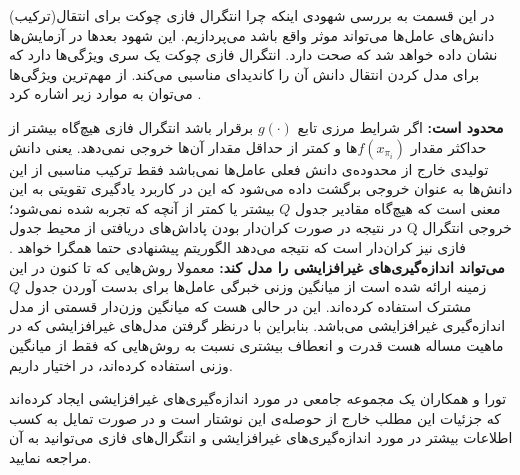 \label{sec:why_fci_works}
در این قسمت به بررسی شهودی اینکه چرا انتگرال فازی چوکت برای انتقال(ترکیب) دانش‌های عامل‌ها می‌تواند موثر واقع باشد می‌پردازیم. این شهود بعدها در آزمایش‌ها نشان داده خواهد شد که صحت دارد. انتگرال فازی چوکت یک سری ویژگی‌ها دارد که برای مدل کردن انتقال دانش آن را کاندیدای مناسبی می‌کند. از مهم‌ترین ویژگی‌ها می‌توان به موارد زیر اشاره کرد .
\begin{enumerate}
 \textbf{محدود است:} اگر شرایط مرزی تابع $g(\cdot)$ برقرار باشد انتگرال‌ فازی هیچ‌گاه بیشتر از حداکثر مقدار $f(x_{\pi_i})$ها و کمتر از حداقل مقدار آن‌ها خروجی نمی‌دهد. یعنی دانش تولیدی خارج از محدوده‌ی دانش فعلی عامل‌ها نمی‌باشد فقط ترکیب مناسبی از این دانش‌ها به عنوان خروجی برگشت داده می‌شود که این در کاربرد یادگیری تقویتی به این معنی است که هیچ‌گاه مقادیر جدول $Q$ بیشتر یا کمتر از آنچه که تجربه شده نمی‌شود؛ در نتیجه در صورت کران‌دار بودن پاداش‌های دریافتی از محیط جدول Q خروجی انتگرال فازی نیز کران‌دار است که نتیجه می‌دهد الگوریتم پیشنهادی حتما همگرا خواهد .
 \textbf{می‌تواند اندازه‌گیری‌های غیرافزایشی را مدل کند:} معمولا روش‌هایی که تا ‌کنون در این زمینه ارائه شده است از میانگین وزنی خبرگی عامل‌ها برای بدست آوردن جدول $Q$ مشترک استفاده کرده‌اند. این در حالی هست که میانگین وزن‌دار قسمتی از مدل اندازه‌گیری‌ غیرافزایشی می‌باشد. بنابراین با درنظر گرفتن مدل‌های غیرافزایشی که در ماهیت مساله هست قدرت و انعطاف بیشتری نسبت به روش‌هایی که فقط از میانگین وزنی استفاده کرده‌اند، در اختیار داریم.
\end{enumerate}

تورا و همکاران یک مجموعه جامعی در مورد اندازه‌گیری‌های غیرافزایشی ایجاد کرده‌اند که جزئیات این مطلب خارج از حوصله‌ی این نوشتار است و در صورت تمایل به کسب اطلاعات بیشتر در مورد اندازه‌گیری‌های غیرافزایشی و انتگرال‌های فازی می‌توانید به آن مراجعه نمایید.

